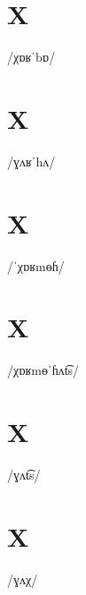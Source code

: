 \documentclass[10pt,a4paper,twoside]{book}
\begin{document}
\section*{X}

\begin{multicols}{3}
 {/χɒʁˈbɒ/} {}
\end{multicols}

\section*{X}

\begin{multicols}{3}
 {/ɣʌʁˈhʌ/} {}
\end{multicols}

\section*{X}

\begin{multicols}{3}
 {/ˈχɒʁmɵɦ/} {}
\end{multicols}

\section*{X}

\begin{multicols}{3}
 {/χɒʁmɵˈɦʌt͡s/} {}
\end{multicols}

\section*{X}

\begin{multicols}{3}
 {/ɣʌt͡s/} {}
\end{multicols}

\section*{X}

\begin{multicols}{3}
 {/ɣʌχ/} {}
\end{multicols}
\end{document}
